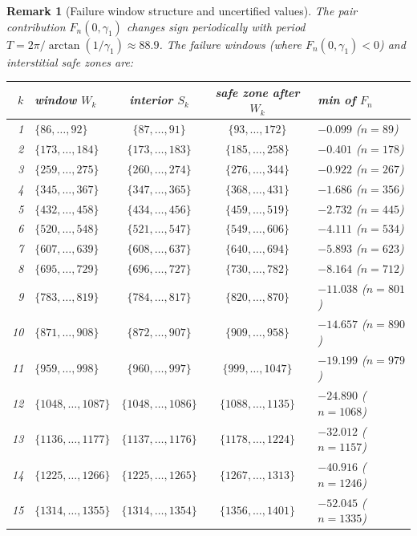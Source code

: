 \documentclass[11pt]{article}
\newtheorem{remark}[theorem]{Remark}
\begin{document}
\begin{remark}[Failure window structure and uncertified values]
\label{rem:windows}
The pair contribution $F_n(0,\gamma_1)$ changes sign periodically with period
$T = 2\pi/\arctan(1/\gamma_1) \approx 88.9$.
The \emph{failure windows} (where $F_n(0,\gamma_1) < 0$) and interstitial safe zones are:
\begin{center}
\begin{tabular}{rlccl}
\toprule
$k$ & window $W_k$ & interior $S_k$ & safe zone after $W_k$ & min of $F_n$ \\
\midrule
1 & $\{86,\ldots,92\}$ & $\{87,\ldots,91\}$ & $\{93,\ldots,172\}$ & $-0.099$ ($n=89$) \\
2 & $\{173,\ldots,184\}$ & $\{173,\ldots,183\}$ & $\{185,\ldots,258\}$ & $-0.401$ ($n=178$) \\
3 & $\{259,\ldots,275\}$ & $\{260,\ldots,274\}$ & $\{276,\ldots,344\}$ & $-0.922$ ($n=267$) \\
4 & $\{345,\ldots,367\}$ & $\{347,\ldots,365\}$ & $\{368,\ldots,431\}$ & $-1.686$ ($n=356$) \\
5 & $\{432,\ldots,458\}$ & $\{434,\ldots,456\}$ & $\{459,\ldots,519\}$ & $-2.732$ ($n=445$) \\
6 & $\{520,\ldots,548\}$ & $\{521,\ldots,547\}$ & $\{549,\ldots,606\}$ & $-4.111$ ($n=534$) \\
7 & $\{607,\ldots,639\}$ & $\{608,\ldots,637\}$ & $\{640,\ldots,694\}$ & $-5.893$ ($n=623$) \\
8 & $\{695,\ldots,729\}$ & $\{696,\ldots,727\}$ & $\{730,\ldots,782\}$ & $-8.164$ ($n=712$) \\
9 & $\{783,\ldots,819\}$ & $\{784,\ldots,817\}$ & $\{820,\ldots,870\}$ & $-11.038$ ($n=801$) \\
10 & $\{871,\ldots,908\}$ & $\{872,\ldots,907\}$ & $\{909,\ldots,958\}$ & $-14.657$ ($n=890$) \\
11 & $\{959,\ldots,998\}$ & $\{960,\ldots,997\}$ & $\{999,\ldots,1047\}$ & $-19.199$ ($n=979$) \\
12 & $\{1048,\ldots,1087\}$ & $\{1048,\ldots,1086\}$ & $\{1088,\ldots,1135\}$ & $-24.890$ ($n=1068$) \\
13 & $\{1136,\ldots,1177\}$ & $\{1137,\ldots,1176\}$ & $\{1178,\ldots,1224\}$ & $-32.012$ ($n=1157$) \\
14 & $\{1225,\ldots,1266\}$ & $\{1225,\ldots,1265\}$ & $\{1267,\ldots,1313\}$ & $-40.916$ ($n=1246$) \\
15 & $\{1314,\ldots,1355\}$ & $\{1314,\ldots,1354\}$ & $\{1356,\ldots,1401\}$ & $-52.045$ ($n=1335$) \\

\end{tabular}
\end{center}
\end{remark}
\end{document}

